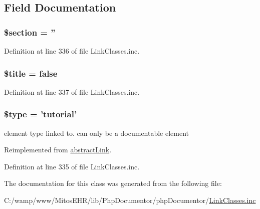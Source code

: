 \subsection{\-Field \-Documentation}
\hypertarget{classtutorial_link_ab43f8e6991eef502a47086fd771e6c94}{
\subsubsection[{\$section}]{\setlength{\rightskip}{0pt plus 5cm}\$section = ''}}\label{classtutorial_link_ab43f8e6991eef502a47086fd771e6c94}


\-Definition at line 336 of file \-Link\-Classes.\-inc.

\hypertarget{classtutorial_link_ada57e7bb7c152edad18fe2f166188691}{
\subsubsection[{\$title}]{\setlength{\rightskip}{0pt plus 5cm}\$title = false}}\label{classtutorial_link_ada57e7bb7c152edad18fe2f166188691}


\-Definition at line 337 of file \-Link\-Classes.\-inc.

\hypertarget{classtutorial_link_a9a4a6fba2208984cabb3afacadf33919}{
\subsubsection[{\$type}]{\setlength{\rightskip}{0pt plus 5cm}\$type = 'tutorial'}}\label{classtutorial_link_a9a4a6fba2208984cabb3afacadf33919}
element type linked to. can only be a documentable element 

\-Reimplemented from \hyperlink{classabstract_link_a9a4a6fba2208984cabb3afacadf33919}{abstract\-Link}.



\-Definition at line 335 of file \-Link\-Classes.\-inc.



\-The documentation for this class was generated from the following file\-:\begin{DoxyCompactItemize}
\item 
\-C\-:/wamp/www/\-Mitos\-E\-H\-R/lib/\-Php\-Documentor/php\-Documentor/\hyperlink{_link_classes_8inc}{\-Link\-Classes.\-inc}\end{DoxyCompactItemize}
